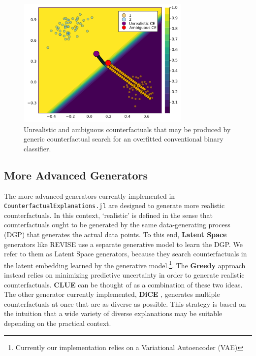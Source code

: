 \documentclass{juliacon}
\begin{document}
\begin{figure}

{\centering \includegraphics[width=3.33333in,height=2.5in]{www/binary_wrong.png}

}

\caption{\label{fig-binary-wrong}Unrealistic and ambiguous
counterfactuals that may be produced by generic counterfactual search
for an overfitted conventional binary classifier.}

\end{figure}

\hypertarget{more-advanced-generators}{%
\subsection{More Advanced Generators}\label{more-advanced-generators}}

The more advanced generators currently implemented in
\texttt{CounterfactualExplanations.jl} are designed to generate more
realistic counterfactuals. In this context, `realistic' is defined in
the sense that counterfactuals ought to be generated by the same
data-generating process (DGP) that generates the actual data points. To
this end, \textbf{Latent Space} generators like REVISE
\cite{joshi2019realistic} use a separate generative model to learn the
DGP. We refer to them as Latent Space generators, because they search
counterfactuals in the latent embedding learned by the generative
model.\footnote{Currently our implementation relies on a Variational
  Autoencoder (VAE)}. The \textbf{Greedy} approach
\cite{schut2021generating} instead relies on minimizing predictive
uncertainty in order to generate realistic counterfactuals.
\textbf{CLUE} \cite{antoran2020getting} can be thought of as a
combination of these two ideas. The other generator currently
implemented, \textbf{DiCE} \cite{mothilal2020explaining}, generates
multiple counterfactuals at once that are as diverse as possible. This
strategy is based on the intuition that a wide variety of diverse
explanations may be suitable depending on the practical context.
\end{document}
